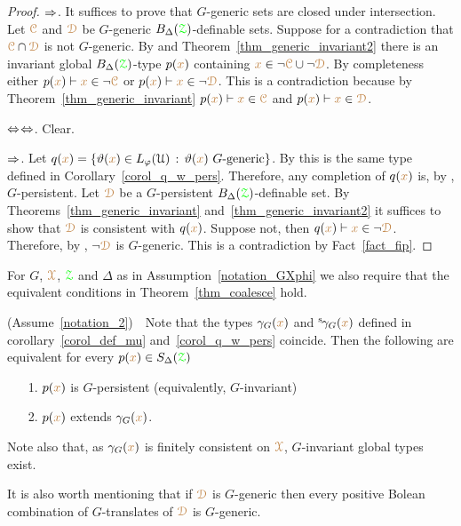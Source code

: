\begin{proof}
  $\Rightarrow$.
  It suffices to prove that $G$-generic sets are closed under intersection.
  Let ${\color{brown}\EuScript C}$ and ${\color{brown}\EuScript D}$ be $G$-generic $B_\Delta({{\color{green}\EuScript Z}})$-definable sets.
  Suppose for a contradiction that ${\color{brown}\EuScript C}\cap{\color{brown}\EuScript D}$ is not $G$-generic.
  By  and Theorem~\ref{thm_generic_invariant2} there is an invariant global $B_\Delta({{\color{green}\EuScript Z}})$-type $p({\color{brown} x})$ containing ${\color{brown} x}\in\neg{\color{brown}\EuScript C}\cup\neg{\color{brown}\EuScript D}$.
  By completeness either $p({\color{brown} x})\vdash{\color{brown}x}\in\neg{\color{brown}\EuScript C}$ or $p({\color{brown} x})\vdash{\color{brown}x}\in\neg{\color{brown}\EuScript D}$.
  This is a contradiction because by Theorem~\ref{thm_generic_invariant} $p({\color{brown} x})\vdash{\color{brown}x}\in{\color{brown}\EuScript C}$ and $p({\color{brown} x})\vdash{\color{brown}x}\in{\color{brown}\EuScript D}$.

  $\Leftrightarrow$$\Leftrightarrow$. Clear.

  $\Rightarrow$.
  Let $q({\color{brown} x})=\{\vartheta({\color{brown} x})\in L_\varphi(\EuScript U)\,:\,\vartheta({\color{brown} x})\textrm{ $G$-generic}\}$.
  By  this is the same type defined in Corollary~\ref{corol_q_w_pers}.
  Therefore, any completion of $q({\color{brown} x})$ is, by , $G$-persistent.
  Let ${\color{brown}\EuScript D}$ be a $G$-persistent $B_\Delta({{\color{green}\EuScript Z}})$-definable set.
  By Theorems~\ref{thm_generic_invariant} and~\ref{thm_generic_invariant2} it suffices to show that ${\color{brown}\EuScript D}$ is consistent with $q({\color{brown} x})$.
  Suppose not, then $q({\color{brown} x})\vdash {\color{brown}x}\in\neg{\color{brown}\EuScript D}$.
  Therefore, by , $\neg{\color{brown}\EuScript D}$ is $G$-generic.
  This is a contradiction by Fact~\ref{fact_fip}.
\end{proof}


\begin{assumption}\label{notation_2}
  For $G$, ${\color{brown}\EuScript X}$, ${\color{green}\EuScript Z}$ and $\Delta$ as in Assumption~\ref{notation_GXphi} we also require that the equivalent conditions in Theorem~\ref{thm_coalesce} hold.
\end{assumption}

\begin{remark}\label{rem_coalesce}
  (Assume~\ref{notation_2})\ \ 
  Note that the types $\gamma_G({\color{brown} x})$ and  ${}^{\rm s}\kern-.2ex\gamma_G({\color{brown} x})$ defined in corollary~\ref{corol_def_mu} and~\ref{corol_q_w_pers} coincide.
  Then the following are equivalent for every $p({\color{brown} x})\in S_\Delta({\color{green}\EuScript Z})$
  \begin{itemize}
    \item[1.] $p({\color{brown} x})$ is $G$-persistent (equivalently, $G$-invariant)
    \item[2.] $p({\color{brown} x})$ extends $\gamma_G({\color{brown} x})$.
  \end{itemize}
  Note also that, as $\gamma_G({\color{brown} x})$ is finitely consistent on ${\color{brown}\EuScript X}$, $G$-invariant global types exist.

  It is also worth mentioning that if ${\color{brown}\EuScript D}$ is $G$-generic then every positive Bolean combination of $G$-translates of ${\color{brown}\EuScript D}$ is $G$-generic.
\end{remark}

